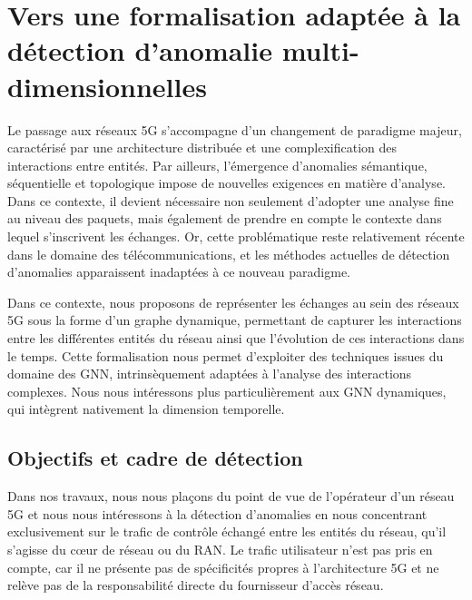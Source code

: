 \documentclass[a4paper,11pt,twoside]{StyleThese}
\providecommand{\minitoc}{}
\providecommand{\dominitoc}{}
\providecommand{\faketableofcontents}{}
\begin{document}
\dominitoc
\faketableofcontents
\fi

\chapter{Vers une formalisation adaptée à la détection d’anomalie multi-dimensionnelles}
\minitoc

Le passage aux réseaux 5G s’accompagne d’un changement de paradigme majeur, caractérisé par une architecture distribuée et une complexification des interactions entre entités. Par ailleurs, l’émergence d’anomalies sémantique, séquentielle et topologique impose de nouvelles exigences en matière d’analyse. Dans ce contexte, il devient nécessaire non seulement d’adopter une analyse fine au niveau des paquets, mais également de prendre en compte le contexte dans lequel s’inscrivent les échanges. Or, cette problématique reste relativement récente dans le domaine des télécommunications, et les méthodes actuelles de détection d’anomalies apparaissent inadaptées à ce nouveau paradigme.

Dans ce contexte, nous proposons de représenter les échanges au sein des réseaux 5G sous la forme d’un graphe dynamique, permettant de capturer les interactions entre les différentes entités du réseau ainsi que l’évolution de ces interactions dans le temps. Cette formalisation nous permet d’exploiter des techniques issues du domaine des GNN, intrinsèquement adaptées à l’analyse des interactions complexes. Nous nous intéressons plus particulièrement aux GNN dynamiques, qui intègrent nativement la dimension temporelle.


\section{Objectifs et cadre de détection}
Dans nos travaux, nous nous plaçons du point de vue de l’opérateur d’un réseau 5G et nous nous intéressons à la détection d’anomalies en nous concentrant exclusivement sur le trafic de contrôle échangé entre les entités du réseau, qu’il s’agisse du cœur de réseau ou du RAN. Le trafic utilisateur n’est pas pris en compte, car il ne présente pas de spécificités propres à l’architecture 5G et ne relève pas de la responsabilité directe du fournisseur d'accès réseau.
\end{document}
